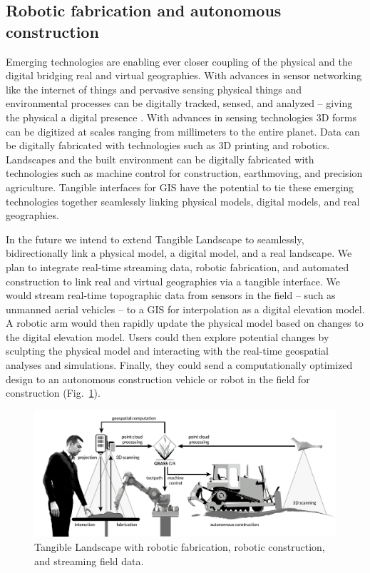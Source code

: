 \documentclass[prodmode,acmtochi]{acmsmall} %
\begin{document}
\subsection{Robotic fabrication and autonomous construction}
%
Emerging technologies are enabling ever closer coupling 
of the physical and the digital 
bridging real and virtual geographies. 
%
With advances in sensor networking like 
the internet of things and pervasive sensing 
physical things and environmental processes
can be digitally tracked, sensed, and analyzed  
-- giving the physical a digital presence \cite{Ratti2009,Resch2011}. 
%
With advances in sensing technologies
3D forms can be digitized at scales ranging from millimeters to the entire planet.
%
Data can be digitally fabricated with technologies such as 3D printing and robotics. 
%
Landscapes and the built environment can be digitally fabricated 
with technologies such as machine control 
for construction, earthmoving, and precision agriculture.
%
Tangible interfaces for GIS have the potential to 
tie these emerging technologies together 
seamlessly linking physical models, digital models, and real geographies. 

In the future we intend to extend Tangible Landscape to 
seamlessly, bidirectionally link 
a physical model, a digital model, and a real landscape.
%
We plan to integrate real-time streaming data, 
robotic fabrication, 
and automated construction 
to link real and virtual geographies via a tangible interface. 
%
We would stream real-time topographic data 
from sensors in the field -- such as unmanned aerial vehicles --
to a GIS for interpolation as a digital elevation model. 
%
A robotic arm would then rapidly update the physical model 
based on changes to the digital elevation model. 
%
Users could then explore potential changes by sculpting the physical model
and interacting with the real-time geospatial analyses and simulations. 
Finally, they could send a computationally optimized design 
to an autonomous construction vehicle or robot in the field for construction 
(Fig.~\ref{fig:system_schema_land}). 

\begin{figure}
\begin{center}
\includegraphics[width=\textwidth]{images/system_schema_land.pdf}
\caption{Tangible Landscape with 
robotic fabrication, robotic construction, and streaming field data.}
\label{fig:system_schema_land}
\end{center}
\end{figure}
\end{document}
